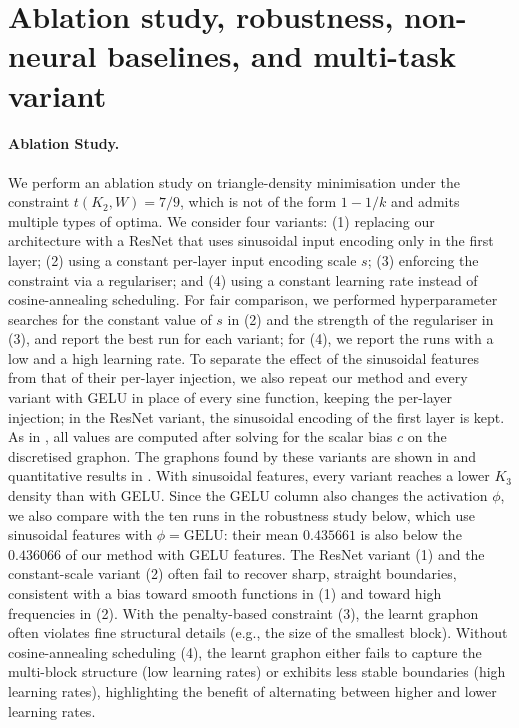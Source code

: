 \documentclass{article}
\theoremstyle{plain}
\theoremstyle{definition}
\theoremstyle{remark}
\begin{document}
\section{Ablation study, robustness, non-neural baselines, and multi-task variant}
\label{sec:ablation}

\providecommand{\PH}[1]{{\color{red}\textbf{[#1]}}}
\providecommand{\PHimg}[1]{\fbox{\parbox[c][0.9\linewidth][c]{0.9\linewidth}{\centering\small\color{red} #1}}}

\paragraph{Ablation Study.}
We perform an ablation study on triangle-density minimisation under the constraint $t(K_2,W)=7/9$, which is not of the form $1-1/k$ and admits multiple types of optima.
We consider four variants: (1) replacing our architecture with a ResNet that uses sinusoidal input encoding only in the first layer; (2) using a constant per-layer input encoding scale $s$; (3) enforcing the constraint via a regulariser; and (4) using a constant learning rate instead of cosine-annealing scheduling.
For fair comparison, we performed hyperparameter searches for the constant value of $s$ in (2) and the strength of the regulariser in (3), and report the best run for each variant; for (4), we report the runs with a low and a high learning rate.
To separate the effect of the sinusoidal features from that of their per-layer injection, we also repeat our method and every variant with GELU in place of every sine function, keeping the per-layer injection; in the ResNet variant, the sinusoidal encoding of the first layer is kept.
As in , all values are computed after solving for the scalar bias $c$ on the discretised graphon.
The graphons found by these variants are shown in  and quantitative results in .
With sinusoidal features, every variant reaches a lower $K_3$ density than with GELU. Since the GELU column also changes the activation $\phi$, we also compare with the ten runs in the robustness study below, which use sinusoidal features with $\phi = \mathrm{GELU}$: their mean $0.435661$ is also below the $0.436066$ of our method with GELU features.
The ResNet variant (1) and the constant-scale variant (2) often fail to recover sharp, straight boundaries, consistent with a bias toward smooth functions in (1) and toward high frequencies in (2).
With the penalty-based constraint (3), the learnt graphon often violates fine structural details (e.g., the size of the smallest block).
Without cosine-annealing scheduling (4), the learnt graphon either fails to capture the multi-block structure (low learning rates) or exhibits less stable boundaries (high learning rates), highlighting the benefit of alternating between higher and lower learning rates.
\end{document}
